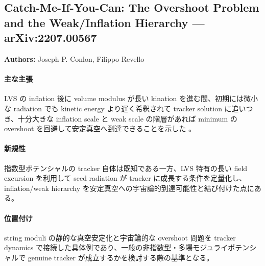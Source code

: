 \subsection{Catch-Me-If-You-Can: The Overshoot Problem and the Weak/Inflation Hierarchy --- arXiv:2207.00567}

\textbf{Authors:} Joseph P. Conlon, Filippo Revello

\paragraph{主な主張}
LVS の inflation 後に volume modulus が長い kination を進む間、初期には微小な radiation でも kinetic energy より遅く希釈されて tracker solution に追いつき、十分大きな inflation scale と weak scale の階層があれば minimum の overshoot を回避して安定真空へ到達できることを示した \cite{Conlon:2022catchme}。

\paragraph{新規性}
指数型ポテンシャルの tracker 自体は既知である一方、LVS 特有の長い field excursion を利用して seed radiation が tracker に成長する条件を定量化し、inflation/weak hierarchy を安定真空への宇宙論的到達可能性と結び付けた点にある。

\paragraph{位置付け}
string moduli の静的な真空安定化と宇宙論的な overshoot 問題を tracker dynamics で接続した具体例であり、一般の非指数型・多場モジュライポテンシャルで genuine tracker が成立するかを検討する際の基準となる。
